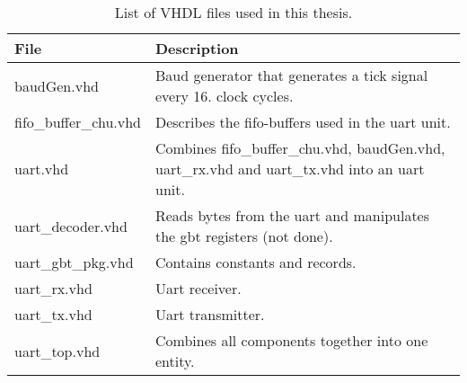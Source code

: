 \documentclass[main.tex]{subfiles}
\begin{document}
\begin{table}[H]
\centering

\begin{tabular}{l p{8cm}}
\hline
 File & Description \\ \hline
 baudGen.vhd & Baud generator that generates a tick signal every 16. clock cycles. \\ %
 fifo\_buffer\_chu.vhd & Describes the fifo-buffers used in the uart unit. \\
 uart.vhd & Combines fifo\_buffer\_chu.vhd, baudGen.vhd, uart\_rx.vhd and uart\_tx.vhd into an uart unit. \\ %
 uart\_decoder.vhd & Reads bytes from the uart and manipulates the gbt registers (not done).\\ %
 uart\_gbt\_pkg.vhd & Contains constants and records. \\ %
 uart\_rx.vhd & Uart receiver. \\ %
 uart\_tx.vhd & Uart transmitter. \\ %
 uart\_top.vhd & Combines all components together into one entity. \\ \hline
\end{tabular}
\label{tab:vhdcode}
\caption{List of VHDL files used in this thesis.}
\end{table}
\end{document}
